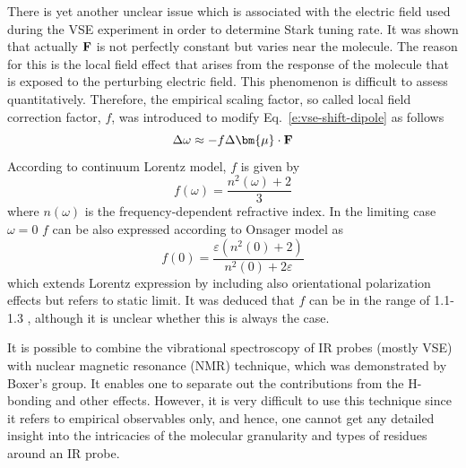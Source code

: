 \documentclass[b5paper,oneside,fleqn,11pt]{book}
\newcommand{\BM}[1]{\bm{#1}}
\begin{document}
\begin{refsection}
There is yet another unclear issue which is associated with the electric field
used during the VSE experiment in order to determine Stark tuning rate.
It was shown that actually ${\bf F}$ is not perfectly constant but varies
near the molecule. The reason for this is the local field effect that arises
from the response of the molecule that is exposed to the perturbing electric field.
This phenomenon is difficult to assess quantitatively. Therefore, 
the empirical scaling factor, so called local field correction factor, $f$, 
was introduced to modify Eq.~\eqref{e:vse-shift-dipole} as follows
%
\begin{equation} \label{e:vse-shift-dipole-corr}
 \Delta \omega \approx - f \Delta {\BM \mu} \cdot {\bf F}
\end{equation}
%
According to continuum Lorentz model, $f$ is given by \citep{Wortmann.Bishop.JCP.1998}
%
\begin{equation}
f(\omega) = \frac{n^2(\omega)+2}{3}
\end{equation}
%
where $n(\omega)$ is the frequency\hyp{}dependent refractive index.
In the limiting case $\omega=0$ $f$ can be also expressed according to Onsager
model as \citep{Wortmann.Bishop.JCP.1998}
%
\begin{equation}
f(0) = \frac{\varepsilon (n^2(0)+2)}{n^2(0)+2\varepsilon}
\end{equation}
%
which extends Lorentz expression by including also orientational polarization effects
but refers to static limit.
It was deduced that $f$ can be in the range of 1.1-1.3 \citep{Wortmann.Bishop.JCP.1998,
Bublitz.Boxer.AnnuRevPhysChem.1997}, although
it is unclear whether this is always the case.

It is possible to combine the vibrational spectroscopy of IR probes (mostly VSE) with nuclear magnetic 
resonance (NMR) technique, which was demonstrated by Bo\-xer's 
group. \citep{Fafarman.Sigala.Herschlag.Boxer.JACS.2010,Bagchi.Fried.Boxer.JACS.2012} 
It enables one
to separate out the contributions from the H\hyp{}bonding and other effects. However, 
it is very difficult to use this technique since it refers to empirical observables only,
and hence, one cannot get any detailed insight into the intricacies of the molecular granularity
and types of residues around an IR probe.


\end{refsection}
\end{document}
